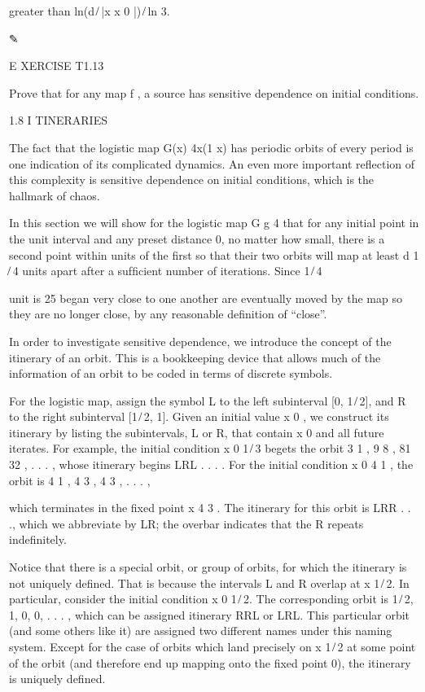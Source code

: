 greater than ln(d ̸ |x  x 0 |) ̸ ln 3.

✎

E XERCISE T1.13

Prove that for any map f , a source has sensitive dependence on initial conditions.

1.8 I TINERARIES

The fact that the logistic map G(x)  4x(1  x) has periodic orbits of every period is one indication of its 
complicated dynamics. An even more important reﬂection of this complexity is sensitive dependence on 
initial conditions, which is the hallmark of chaos.

In this section we will show for the logistic map G  g 4 that for any initial point in the unit interval 
and any preset distance  
 0, no matter how small, there is a second point within  units of the ﬁrst so that their two orbits will 
map at least d  1 ̸ 4 units apart after a sufﬁcient number of iterations. Since 1 ̸ 4

unit is 25%
began very close to one another are eventually moved by the map so they are no longer close, by any 
reasonable deﬁnition of “close”.

In order to investigate sensitive dependence, we introduce the concept of the itinerary of an orbit. This 
is a bookkeeping device that allows much of the information of an orbit to be coded in terms of discrete 
symbols.

For the logistic map, assign the symbol L to the left subinterval [0, 1 ̸ 2], and R to the right subinterval 
[1 ̸ 2, 1]. Given an initial value x 0 , we construct its itinerary by listing the subintervals, L or R, 
that contain x 0 and all future iterates. For example, the initial condition x 0  1 ̸ 3 begets the orbit 3 1 
, 9 8 , 81 32 , . . .  , whose itinerary begins LRL . . . . For the initial condition x 0  4 1 , the orbit 
is 4 1 , 4 3 , 4 3 , . . .  ,

which terminates in the ﬁxed point x  4 3 . The itinerary for this orbit is LRR . . ., which we abbreviate 
by LR; the overbar indicates that the R repeats indeﬁnitely.

Notice that there is a special orbit, or group of orbits, for which the itinerary is not uniquely deﬁned. 
That is because the intervals L and R overlap at x  1 ̸ 2. In particular, consider the initial condition x 0  
1 ̸ 2. The corresponding orbit is 1 ̸ 2, 1, 0, 0, . . .  , which can be assigned itinerary RRL or LRL. This 
particular orbit (and some others like it) are assigned two different names under this naming system. 
Except for the case of orbits which land precisely on x  1 ̸ 2 at some point of the orbit (and therefore end 
up mapping onto the ﬁxed point 0), the itinerary is uniquely deﬁned.

